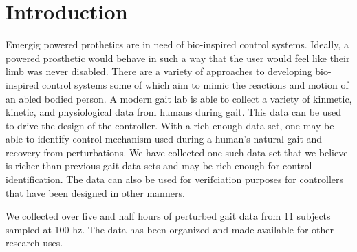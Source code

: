 \documentclass{article}
\begin{document}
\section{Introduction}

Emergig powered prothetics are in need of bio-inspired control systems.
Ideally, a powered prosthetic would behave in such a way that the user would
feel like their limb was never disabled. There are a variety of approaches to
developing bio-inspired control systems some of which aim to mimic the
reactions and motion of an abled bodied person. A modern gait lab is able to
collect a variety of kinmetic, kinetic, and physiological data from humans
during gait. This data can be used to drive the design of the controller. With
a rich enough data set, one may be able to identify control mechanism used
during a human's natural gait and recovery from perturbations. We have
collected one such data set that we believe is richer than previous gait data
sets and may be rich enough for control identification. The data can also be
used for verifciation purposes for controllers that have been designed in other
manners.

We collected over five and half hours of perturbed gait data from 11 subjects
sampled at 100 hz. The data has been organized and made available for other
research uses.
\end{document}
